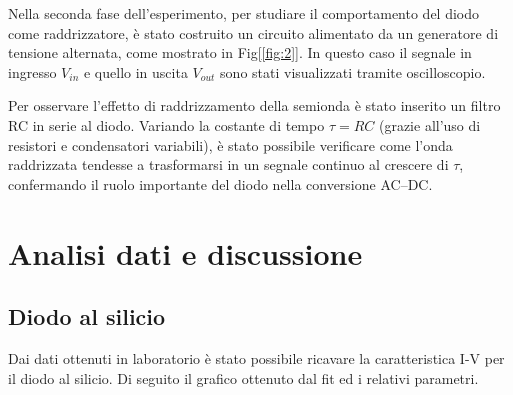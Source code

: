 \documentclass[9pt,a4paper,twocolumn,twoside]{tau-class/tau}
\begin{document}
Nella seconda fase dell’esperimento, per studiare il comportamento del diodo come raddrizzatore, è stato costruito un circuito alimentato da un generatore di tensione alternata, come mostrato in Fig[\ref{fig:2}]. In questo caso il segnale in ingresso $V_{in}$ e quello in uscita $V_{out}$ sono stati visualizzati tramite oscilloscopio.

Per osservare l'effetto di raddrizzamento della semionda è stato inserito un filtro RC in serie al diodo. Variando la costante di tempo $\tau = RC$ (grazie all'uso di resistori e condensatori variabili), è stato possibile verificare come l'onda raddrizzata tendesse a trasformarsi in un segnale continuo al crescere di $\tau$, confermando il ruolo importante del diodo nella conversione AC–DC.
\section{Analisi dati e discussione}
\subsection{Diodo al silicio}
Dai dati ottenuti in laboratorio è stato possibile ricavare la caratteristica I-V per il diodo al silicio. Di seguito il grafico ottenuto dal fit ed i relativi parametri. 
\end{document}
